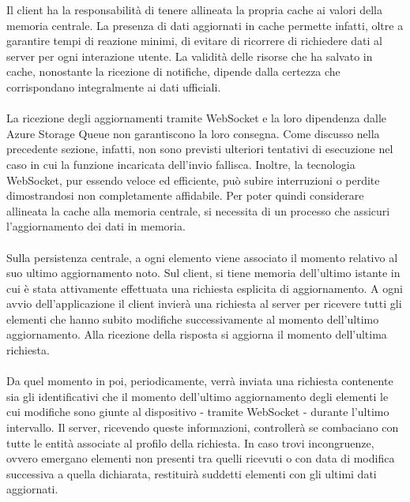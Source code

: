 Il client ha la responsabilità di tenere allineata
la propria cache ai valori della memoria centrale. 
La presenza di dati aggiornati in cache permette infatti,
oltre a garantire tempi di reazione minimi,
di evitare di ricorrere di richiedere dati al server per ogni interazione utente.
La validità delle risorse che ha salvato in cache,
nonostante la ricezione di notifiche, 
dipende dalla certezza che corrispondano integralmente ai dati ufficiali.\\
\\
La ricezione degli aggiornamenti tramite WebSocket e 
la loro dipendenza dalle Azure Storage Queue non garantiscono la loro consegna.
Come discusso nella precedente sezione, infatti, 
non sono previsti ulteriori tentativi di esecuzione nel caso in cui 
la funzione incaricata dell'invio fallisca.
Inoltre, la tecnologia WebSocket, pur essendo veloce ed efficiente, 
può subire interruzioni o perdite dimostrandosi non completamente affidabile.
Per poter quindi considerare allineata la cache alla memoria centrale, 
si necessita di un processo che assicuri l'aggiornamento dei dati in memoria.\\
\\
Sulla persistenza centrale, 
a ogni elemento viene associato il momento relativo al suo ultimo aggiornamento noto.
Sul client, si tiene memoria dell'ultimo istante in cui è stata 
attivamente effettuata una richiesta esplicita di aggiornamento.  
A ogni avvio dell'applicazione il client invierà una richiesta al server 
per ricevere tutti gli elementi che hanno subito modifiche 
successivamente al momento dell'ultimo aggiornamento.
Alla ricezione della risposta si aggiorna il momento dell'ultima richiesta.\\
\\
Da quel momento in poi, periodicamente, 
verrà inviata una richiesta contenente
sia gli identificativi che il momento dell'ultimo aggiornamento 
degli elementi le cui modifiche sono giunte al dispositivo
- tramite WebSocket - durante l'ultimo intervallo.
Il server, ricevendo queste informazioni, controllerà se combaciano con tutte le entità 
associate al profilo della richiesta.
In caso trovi incongruenze, ovvero emergano elementi non presenti tra quelli ricevuti o 
con data di modifica successiva a quella dichiarata, 
restituirà suddetti elementi con gli ultimi dati aggiornati.
\clearpage